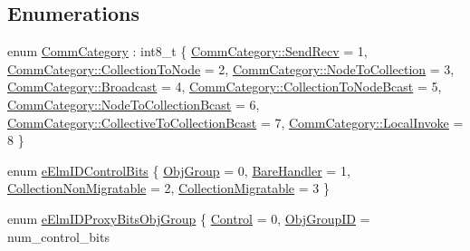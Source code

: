 \subsection*{Enumerations}
\begin{DoxyCompactItemize}
\item 
enum \hyperlink{namespacevt_1_1elm_ab7367fdbe88bdcf329563642147f9ae2}{Comm\+Category} \+: int8\+\_\+t \{ \newline
\hyperlink{namespacevt_1_1elm_ab7367fdbe88bdcf329563642147f9ae2a95aeb71ffd419cc14c6929f9dcd6cdff}{Comm\+Category\+::\+Send\+Recv} = 1, 
\hyperlink{namespacevt_1_1elm_ab7367fdbe88bdcf329563642147f9ae2abae8da2cdb9a00dd6dc7b7e642ff8192}{Comm\+Category\+::\+Collection\+To\+Node} = 2, 
\hyperlink{namespacevt_1_1elm_ab7367fdbe88bdcf329563642147f9ae2ae5ac0d75517cea8a327fc5252da63e0b}{Comm\+Category\+::\+Node\+To\+Collection} = 3, 
\hyperlink{namespacevt_1_1elm_ab7367fdbe88bdcf329563642147f9ae2abe55b6387170df0ca68f41225268e842}{Comm\+Category\+::\+Broadcast} = 4, 
\newline
\hyperlink{namespacevt_1_1elm_ab7367fdbe88bdcf329563642147f9ae2acf4b5610366267918ea6dc2def3edd13}{Comm\+Category\+::\+Collection\+To\+Node\+Bcast} = 5, 
\hyperlink{namespacevt_1_1elm_ab7367fdbe88bdcf329563642147f9ae2ae78a087708e2798bf753815e58e0d09a}{Comm\+Category\+::\+Node\+To\+Collection\+Bcast} = 6, 
\hyperlink{namespacevt_1_1elm_ab7367fdbe88bdcf329563642147f9ae2a057b8dfc0741801e337e981d77b4abce}{Comm\+Category\+::\+Collective\+To\+Collection\+Bcast} = 7, 
\hyperlink{namespacevt_1_1elm_ab7367fdbe88bdcf329563642147f9ae2ad3b099c32afd358626c571a1c02bd197}{Comm\+Category\+::\+Local\+Invoke} = 8
 \}
\item 
enum \hyperlink{namespacevt_1_1elm_a38258bcd01ff9b6e184a30afdd3a7df2}{e\+Elm\+I\+D\+Control\+Bits} \{ \hyperlink{namespacevt_1_1elm_a38258bcd01ff9b6e184a30afdd3a7df2a9a8bae44b1c2c9dfcfc7bafaa3b98c71}{Obj\+Group} = 0, 
\hyperlink{namespacevt_1_1elm_a38258bcd01ff9b6e184a30afdd3a7df2a2082a9f9beb5b70fd737977634a29604}{Bare\+Handler} = 1, 
\hyperlink{namespacevt_1_1elm_a38258bcd01ff9b6e184a30afdd3a7df2ac88ba39c7107756d2ed76027774e9d68}{Collection\+Non\+Migratable} = 2, 
\hyperlink{namespacevt_1_1elm_a38258bcd01ff9b6e184a30afdd3a7df2ab35c17724f30b29298f0006ca1d72f7a}{Collection\+Migratable} = 3
 \}
\item 
enum \hyperlink{namespacevt_1_1elm_ab2606b4fa55a31961da3b9379b3eb70d}{e\+Elm\+I\+D\+Proxy\+Bits\+Obj\+Group} \{ \hyperlink{namespacevt_1_1elm_ab2606b4fa55a31961da3b9379b3eb70da3edd375dc89b1e0779fc3339a73d2363}{Control} = 0, 
\hyperlink{namespacevt_1_1elm_ab2606b4fa55a31961da3b9379b3eb70dadd6842154f796a6d28224831c6afa5a7}{Obj\+Group\+ID} = num\+\_\+control\+\_\+bits

\end{DoxyCompactItemize}
